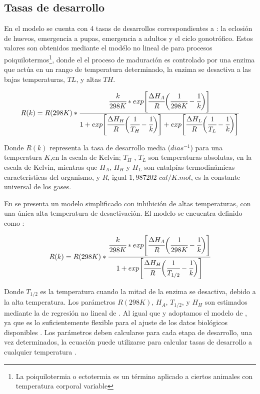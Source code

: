 \subsection{Tasas de desarrollo}
\label{subsec:cap4-tasas de desarrollo}
En el modelo se cuenta con 4 tasas de desarrollos correspondientes a : la eclosión de huevos,
emergencia a pupas, emergencia a adultos y el ciclo gonotrófico. Estos valores son obtenidos
mediante el modélo no lineal de \citet{sharpe1977reaction} para procesos poiquilotermos\footnote{
La poiquilotermia o ectotermia es un término aplicado a ciertos animales con temperatura corporal
variable}, donde el el proceso de maduración es controlado por una enzima que actúa en un rango de
temperatura determinado, la enzima se desactiva a las bajas temperaturas, $TL$, y altas $TH$.

\begin{equation} \label{eq:sharpe-demichele}
   R(k)  = R(298K) *\cfrac{ \cfrac{k}{298K} *
    exp \Bigg[
            \cfrac{\Delta H_{A}}{R} \bigg(\cfrac{1}{298K} - \cfrac{1}{k}\bigg)
        \Bigg]}
    {1 + exp\Bigg[\cfrac{\Delta H_{H}}{R} \bigg(\cfrac{1}{T_{H}}- \cfrac{1}{k}\bigg)\Bigg] +  exp\Bigg[\cfrac{\Delta H_{L}}{R} \bigg(\cfrac{1}{T_{L}}- \cfrac{1}{k}\bigg)\Bigg]}
\end{equation}

Donde $R(k)$ representa la tasa de desarrollo media ($dias^{-1}$) para una temperatura $K$,en la
escala de Kelvin; $T_{H}$ , $T_{L}$ son temperaturas absolutas, en la escala de Kelvin, mientras
que $H_{A}$, $H_{H}$ y $H_{L}$ son entalpías termodinámicas características del organismo, y $R$,
igual $1,987202$ $cal/K.mol$, es la constante universal de los gases.

En \citet{schoolfield1981non} se presenta un modelo simplificado con inhibición de altas
temperaturas, con una única alta temperatura de desactivación. El modelo se encuentra definido
como :

\begin{equation} \label{eq:schoolfield}
   R(k)  = R(298K) *\cfrac{ \cfrac{k}{298K} *
    exp \Bigg[
            \cfrac{\Delta H_{A}}{R} \bigg(\cfrac{1}{298K} - \cfrac{1}{k}\bigg)
        \Bigg]}
    {1 + exp\Bigg[\cfrac{\Delta H_{H}}{R} \bigg(\cfrac{1}{T_{1/2}}- \cfrac{1}{k}\bigg)\Bigg] }
\end{equation}

Donde $T_{1/2}$ es la temperatura cuando la mitad de la enzima se desactiva, debido a la alta
temperatura. Los parámetros $R(298K)$, $H_{A}$, $T_{1/2}$, y $H_{H}$ son estimados mediante la
de regresión no lineal de \citet{wagner1984modeling}. Al igual que \citet{rueda1990temperature} y
\citet{otero2006stochastic} adoptamos el modelo de \citet{schoolfield1981non}, ya que es lo
suficientemente flexible para el ajuste de los datos biológicos disponibles
\citep{otero2006stochastic}. Los parámetros deben calcularse para cada etapa de desarrollo, una
vez determinados, la ecuación puede utilizarse para calcular tasas de desarrollo a cualquier
temperatura \citep{rueda1990temperature}.
